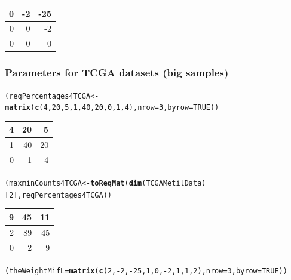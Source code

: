 \documentclass[a4paper,10pt]{article}\usepackage[]{graphicx}\usepackage[]{xcolor}
\makeatletter
\newcommand{\hlnum}[1]{\textcolor[rgb]{0.686,0.059,0.569}{#1}}%
\newcommand{\hlopt}[1]{\textcolor[rgb]{0,0,0}{#1}}%
\newcommand{\hlstd}[1]{\textcolor[rgb]{0.345,0.345,0.345}{#1}}%
\newcommand{\hlkwb}[1]{\textcolor[rgb]{0.69,0.353,0.396}{#1}}%
\newcommand{\hlkwc}[1]{\textcolor[rgb]{0.333,0.667,0.333}{#1}}%
\newcommand{\hlkwd}[1]{\textcolor[rgb]{0.737,0.353,0.396}{\textbf{#1}}}%
\newenvironment{kframe}{%
 \def\at@end@of@kframe{}%
 \ifinner\ifhmode%
  \def\at@end@of@kframe{\end{minipage}}%
  \begin{minipage}{\columnwidth}%
 \fi\fi%
 \def\FrameCommand##1{\hskip\@totalleftmargin \hskip-\fboxsep
 \colorbox{shadecolor}{##1}\hskip-\fboxsep
     \hskip-\linewidth \hskip-\@totalleftmargin \hskip\columnwidth}%
 \MakeFramed {\advance\hsize-\width
   \@totalleftmargin\z@ \linewidth\hsize
   \@setminipage}}%
 {\par\unskip\endMakeFramed%
 \at@end@of@kframe}
\newenvironment{knitrout}{}{} %
\makeatother
\begin{document}
\begin{knitrout}
\begin{tabular}{r|r|r}
\hline
0 & -2 & -25\\
\hline
0 & 0 & -2\\
\hline
0 & 0 & 0\\
\hline
\end{tabular}
\end{knitrout}

\subsubsection{Parameters for TCGA datasets (big samples)}
\begin{knitrout}
\color{fgcolor}\begin{kframe}
\begin{alltt}
\hlstd{(reqPercentages4TCGA} \hlkwb{<-} \hlkwd{matrix} \hlstd{(}\hlkwd{c}\hlstd{(}\hlnum{4}\hlstd{,} \hlnum{20}\hlstd{,} \hlnum{5}\hlstd{,} \hlnum{1}\hlstd{,} \hlnum{40}\hlstd{,} \hlnum{20}\hlstd{,} \hlnum{0}\hlstd{,} \hlnum{1}\hlstd{,} \hlnum{4}\hlstd{),} \hlkwc{nrow}\hlstd{=}\hlnum{3}\hlstd{,} \hlkwc{byrow}\hlstd{=}\hlnum{TRUE}\hlstd{))}
\end{alltt}
\end{kframe}


\begin{tabular}{r|r|r}
\hline
4 & 20 & 5\\
\hline
1 & 40 & 20\\
\hline
0 & 1 & 4\\
\hline
\end{tabular}\begin{kframe}\begin{alltt}
\hlstd{(maxminCounts4TCGA} \hlkwb{<-} \hlkwd{toReqMat}\hlstd{(}\hlkwd{dim}\hlstd{(TCGAMetilData)[}\hlnum{2}\hlstd{], reqPercentages4TCGA))}
\end{alltt}
\end{kframe}


\begin{tabular}{r|r|r}
\hline
9 & 45 & 11\\
\hline
2 & 89 & 45\\
\hline
0 & 2 & 9\\
\hline
\end{tabular}\begin{kframe}\begin{alltt}
\hlstd{(theWeightMifL}\hlkwb{=}\hlkwd{matrix} \hlstd{(}\hlkwd{c}\hlstd{(}\hlnum{2}\hlstd{,}\hlopt{-}\hlnum{2}\hlstd{,}\hlopt{-}\hlnum{25}\hlstd{,}\hlnum{1}\hlstd{,}\hlnum{0}\hlstd{,}\hlopt{-}\hlnum{2}\hlstd{,}\hlnum{1}\hlstd{,}\hlnum{1}\hlstd{,}\hlnum{2}\hlstd{),} \hlkwc{nrow}\hlstd{=}\hlnum{3}\hlstd{,} \hlkwc{byrow}\hlstd{=}\hlnum{TRUE}\hlstd{))}
\end{alltt}
\end{kframe}



\end{knitrout}
\end{document}
